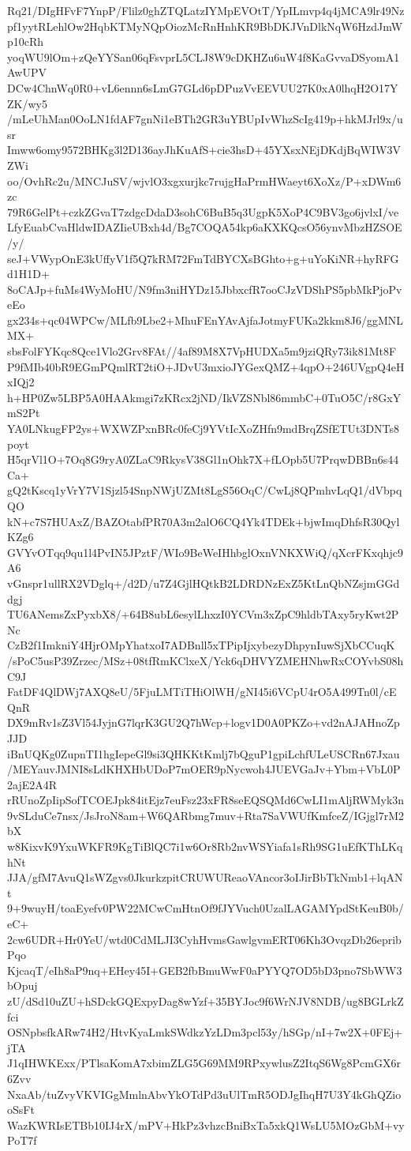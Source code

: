Rq21/DIgHFvF7YnpP/Flilz0ghZTQLatzIYMpEVOtT/YpILmvp4q4jMCA9lr49Nz
pf1yytRLehlOw2HqbKTMyNQpOiozMcRnHnhKR9BbDKJVnDlkNqW6HzdJmWp10cRh
yoqWU9lOm+zQeYYSan06qFsvprL5CLJ8W9cDKHZu6uW4f8KaGvvaDSyomA1AwUPV
DCw4ChnWq0R0+vL6ennn6sLmG7GLd6pDPuzVvEEVUU27K0xA0lhqH2O17YZK/wy5
/mLeUhMan0OoLN1fdAF7gnNi1eBTh2GR3uYBUpIvWhzScIg419p+hkMJrl9x/usr
Imww6omy9572BHKg3l2D136ayJhKuAfS+cie3hsD+45YXsxNEjDKdjBqWIW3VZWi
oo/OvhRc2u/MNCJuSV/wjvlO3xgxurjkc7rujgHaPrmHWaeyt6XoXz/P+xDWm6zc
79R6GelPt+czkZGvaT7zdgcDdaD3sohC6BuB5q3UgpK5XoP4C9BV3go6jvlxI/ve
LfyEuabCvaHldwIDAZIieUBxh4d/Bg7COQA54kp6aKXKQcsO56ynvMbzHZSOE/y/
seJ+VWypOnE3kUffyV1f5Q7kRM72FmTdBYCXsBGhto+g+uYoKiNR+hyRFGd1H1D+
8oCAJp+fuMs4WyMoHU/N9fm3niHYDz15JbbxcfR7ooCJzVDShPS5pbMkPjoPveEo
gx234s+qc04WPCw/MLfb9Lbe2+MhuFEnYAvAjfaJotmyFUKa2kkm8J6/ggMNLMX+
sbsFolFYKqc8Qce1Vlo2Grv8FAt//4af89M8X7VpHUDXa5m9jziQRy73ik81Mt8F
P9fMIb40bR9EGmPQmlRT2tiO+JDvU3mxioJYGexQMZ+4qpO+246UVgpQ4eHxIQj2
h+HP0Zw5LBP5A0HAAkmgi7zKRcx2jND/IkVZSNbl86mmbC+0TuO5C/r8GxYmS2Pt
YA0LNkugFP2ys+WXWZPxnBRc0feCj9YVtIcXoZHfn9mdBrqZSfETUt3DNTs8poyt
H5qrVl1O+7Oq8G9ryA0ZLaC9RkysV38Gl1nOhk7X+fLOpb5U7PrqwDBBn6s44Ca+
gQ2tKscq1yVrY7V1Sjzl54SnpNWjUZMt8LgS56OqC/CwLj8QPmhvLqQ1/dVbpqQO
kN+c7S7HUAxZ/BAZOtabfPR70A3m2alO6CQ4Yk4TDEk+bjwImqDhfsR30QylKZg6
GVYvOTqq9qu1l4PvIN5JPztF/WIo9BeWeIHhbglOxnVNKXWiQ/qXcrFKxqhjc9A6
vGnspr1ullRX2VDglq+/d2D/u7Z4GjlHQtkB2LDRDNzExZ5KtLnQbNZsjmGGddgj
TU6ANemsZxPyxbX8/+64B8ubL6esylLhxzI0YCVm3xZpC9hldbTAxy5ryKwt2PNc
CzB2f1ImkniY4HjrOMpYhatxoI7ADBnll5xTPipIjxybezyDhpynIuwSjXbCCuqK
/sPoC5usP39Zrzec/MSz+08tfRmKClxeX/Yck6qDHVYZMEHNhwRxCOYvbS08hC9J
FatDF4QlDWj7AXQ8eU/5FjuLMTiTHiOlWH/gNI45i6VCpU4rO5A499Tn0l/cEQnR
DX9mRv1sZ3Vl54JyjnG7lqrK3GU2Q7hWcp+logv1D0A0PKZo+vd2nAJAHnoZpJJD
iBnUQKg0ZupnTI1hgIepeGl9si3QHKKtKmlj7bQguP1gpiLchfULeUSCRn67Jxau
/MEYauvJMNI8sLdKHXHbUDoP7mOER9pNycwoh4JUEVGaJv+Ybm+VbL0P2ajE2A4R
rRUnoZpIipSofTCOEJpk84itEjz7euFsz23xFR8seEQSQMd6CwLI1mAljRWMyk3n
9vSLduCe7nsx/JsJroN8am+W6QARbmg7muv+Rta7SaVWUfKmfceZ/IGjgl7rM2bX
w8KixvK9YxuWKFR9KgTiBlQC7i1w6Or8Rb2nvWSYiafa1sRh9SG1uEfKThLKqhNt
JJA/gfM7AvuQ1sWZgvs0JkurkzpitCRUWUReaoVAncor3oIJirBbTkNmb1+lqANt
9+9wuyH/toaEyefv0PW22MCwCmHtnOf9fJYVuch0UzalLAGAMYpdStKeuB0b/eC+
2cw6UDR+Hr0YeU/wtd0CdMLJI3CyhHvmsGawlgvmERT06Kh3OvqzDb26epribPqo
KjcaqT/eIh8aP9nq+EHey45I+GEB2fbBmuWwF0aPYYQ7OD5bD3pno7SbWW3bOpuj
zU/dSd10uZU+hSDckGQExpyDag8wYzf+35BYJoc9f6WrNJV8NDB/ug8BGLrkZfci
OSNpbsfkARw74H2/HtvKyaLmkSWdkzYzLDm3pcl53y/hSGp/nI+7w2X+0FEj+jTA
J1qIHWKExx/PTlsaKomA7xbimZLG5G69MM9RPxywlusZ2ItqS6Wg8PcmGX6r6Zvv
NxaAb/tuZvyVKVIGgMmlnAbvYkOTdPd3uUlTmR5ODJgIhqH7U3Y4kGhQZiooSsFt
WazKWRIsETBb10IJ4rX/mPV+HkPz3vhzcBniBxTa5xkQ1WsLU5MOzGbM+vyPoT7f
